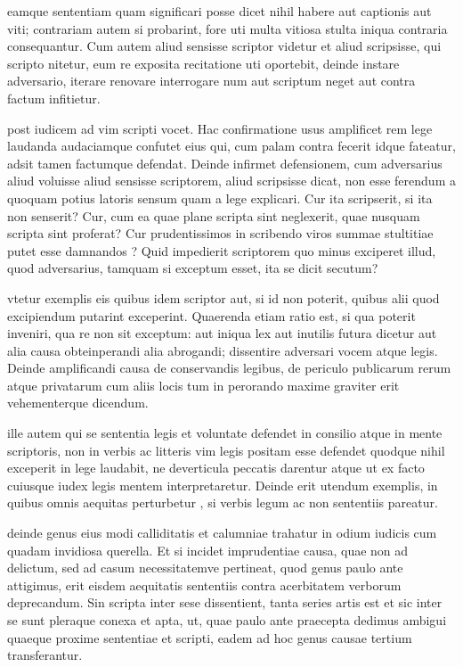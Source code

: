  eamque sententiam quam significari posse dicet nihil habere aut captionis aut viti; contrariam autem si probarint, fore uti multa vitiosa stulta iniqua contraria consequantur. Cum autem aliud sensisse scriptor videtur et aliud scripsisse, qui scripto nitetur, eum re exposita recitatione uti oportebit, deinde instare adversario, iterare renovare interrogare num aut scriptum neget aut contra factum infitietur.

 post iudicem ad vim scripti vocet. Hac confirmatione usus amplificet rem lege laudanda audaciamque confutet eius qui, cum palam contra fecerit idque fateatur, adsit tamen factumque defendat. Deinde infirmet defensionem, cum adversarius aliud voluisse aliud sensisse scriptorem, aliud scripsisse dicat, non esse ferendum a quoquam potius latoris sensum quam a lege explicari. Cur ita scripserit, si ita non senserit? Cur, cum ea quae plane scripta sint neglexerit, quae nusquam scripta sint proferat? Cur prudentissimos in scribendo viros summae stultitiae putet esse damnandos ? Quid impedierit scriptorem quo minus exciperet illud, quod adversarius, tamquam si exceptum esset, ita se dicit secutum?

 vtetur exemplis eis quibus idem scriptor aut, si id non poterit, quibus alii quod excipiendum putarint exceperint. Quaerenda etiam ratio est, si qua poterit inveniri, qua re non sit exceptum: aut iniqua lex aut inutilis futura dicetur aut alia causa obteinperandi alia abrogandi; dissentire adversari vocem atque legis. Deinde amplificandi causa de conservandis legibus, de periculo publicarum rerum atque privatarum cum aliis locis tum in perorando maxime graviter erit vehementerque dicendum.

 ille autem qui se sententia legis et voluntate defendet in consilio atque in mente scriptoris, non in verbis ac litteris vim legis positam esse defendet quodque nihil exceperit in lege laudabit, ne deverticula peccatis darentur atque ut ex facto cuiusque iudex legis mentem interpretaretur. Deinde erit utendum exemplis, in quibus omnis aequitas perturbetur , si verbis legum ac non sententiis pareatur.

 deinde genus eius modi calliditatis et calumniae trahatur in odium iudicis cum quadam invidiosa querella. Et si incidet imprudentiae causa, quae non ad delictum, sed ad casum necessitatemve pertineat, quod genus paulo ante attigimus, erit eisdem aequitatis sententiis contra acerbitatem verborum deprecandum. Sin scripta inter sese dissentient, tanta series artis est et sic inter se sunt pleraque conexa et apta, ut, quae paulo ante praecepta dedimus ambigui quaeque proxime sententiae et scripti, eadem ad hoc genus causae tertium transferantur.

